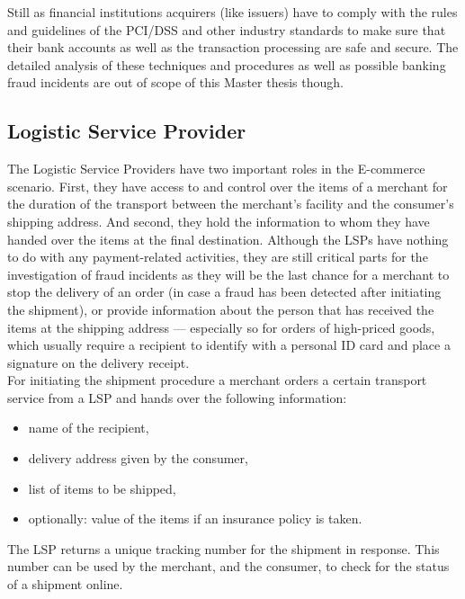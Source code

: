 Still as financial institutions acquirers (like issuers) have to comply with the rules and guidelines of the \gls{PCI/DSS} and other industry standards to make sure that their bank accounts as well as the transaction processing are safe and secure. The detailed analysis of these techniques and procedures as well as possible banking fraud incidents are out of scope of this Master thesis though.


\subsection{Logistic Service Provider}
\label{subsec:stakeholder_lsp}

The Logistic Service Providers have two important roles in the \gls{E-commerce} scenario. First, they have access to and control over the items of a merchant for the duration of the transport between the merchant's facility and the consumer's shipping address. And second, they hold the information to whom they have handed over the items at the final destination. Although the \gls{LSP}s have nothing to do with any payment-related activities, they are still critical parts for the investigation of fraud incidents as they will be the last chance for a merchant to stop the delivery of an order (in case a fraud has been detected after initiating the shipment), or provide information about the person that has received the items at the shipping address --- especially so for orders of high-priced goods, which usually require a recipient to identify with a personal ID card and place a signature on the delivery receipt. \\

For initiating the shipment procedure a merchant orders a certain transport service from a \gls{LSP} and hands over the following information:\@

\begin{itemize}
	\item name of the recipient,
	\item delivery address given by the consumer,
	\item list of items to be shipped,
	\item optionally: value of the items if an insurance policy is taken.
\end{itemize}

The \gls{LSP} returns a unique tracking number for the shipment in response. This number can be used by the merchant, and the consumer, to check for the status of a shipment online. \\

